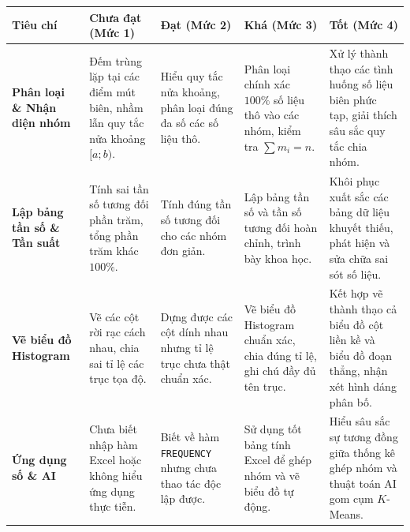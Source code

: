 \documentclass[12pt, a4paper]{article}
\begin{document}
\begin{center}
\small
\begin{tabularx}{\textwidth}{|p{2.8cm}|X|X|X|X|}
\hline
\textbf{Tiêu chí} & \textbf{Chưa đạt (Mức 1)} & \textbf{Đạt (Mức 2)} & \textbf{Khá (Mức 3)} & \textbf{Tốt (Mức 4)} \\ \hline
\textbf{Phân loại \& Nhận diện nhóm} & Đếm trùng lặp tại các điểm mút biên, nhầm lẫn quy tắc nửa khoảng $[a; b)$. & Hiểu quy tắc nửa khoảng, phân loại đúng đa số các số liệu thô. & Phân loại chính xác $100\%$ số liệu thô vào các nhóm, kiểm tra $\sum m_i = n$. & Xử lý thành thạo các tình huống số liệu biên phức tạp, giải thích sâu sắc quy tắc chia nhóm. \\ \hline
\textbf{Lập bảng tần số \& Tần suất} & Tính sai tần số tương đối phần trăm, tổng phần trăm khác $100\%$. & Tính đúng tần số tương đối cho các nhóm đơn giản. & Lập bảng tần số và tần số tương đối hoàn chỉnh, trình bày khoa học. & Khôi phục xuất sắc các bảng dữ liệu khuyết thiếu, phát hiện và sửa chữa sai sót số liệu. \\ \hline
\textbf{Vẽ biểu đồ Histogram} & Vẽ các cột rời rạc cách nhau, chia sai tỉ lệ các trục tọa độ. & Dựng được các cột dính nhau nhưng tỉ lệ trục chưa thật chuẩn xác. & Vẽ biểu đồ Histogram chuẩn xác, chia đúng tỉ lệ, ghi chú đầy đủ tên trục. & Kết hợp vẽ thành thạo cả biểu đồ cột liền kề và biểu đồ đoạn thẳng, nhận xét hình dáng phân bố. \\ \hline
\textbf{Ứng dụng số \& AI} & Chưa biết nhập hàm Excel hoặc không hiểu ứng dụng thực tiễn. & Biết về hàm \texttt{FREQUENCY} nhưng chưa thao tác độc lập được. & Sử dụng tốt bảng tính Excel để ghép nhóm và vẽ biểu đồ tự động. & Hiểu sâu sắc sự tương đồng giữa thống kê ghép nhóm và thuật toán AI gom cụm $K$-Means. \\ \hline
\end{tabularx}
\end{center}
\end{document}
